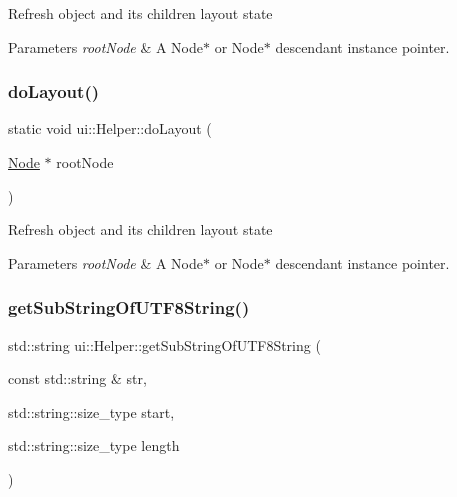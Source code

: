 Refresh object and it\textquotesingle{}s children layout state


\begin{DoxyParams}{Parameters}
{\em root\+Node} & A Node$\ast$ or Node$\ast$ descendant instance pointer. \\
\hline
\end{DoxyParams}
\mbox{\label{classui_1_1Helper_ab57b1f6c65bc4798f6ffb09f0eaae335}} 
\subsubsection{\texorpdfstring{do\+Layout()}{doLayout()}\hspace{0.1cm}{\footnotesize\ttfamily [2/2]}}
{\footnotesize\ttfamily static void ui\+::\+Helper\+::do\+Layout (\begin{DoxyParamCaption}\item[{\hyperlink{classNode}{Node} $\ast$}]{root\+Node }\end{DoxyParamCaption})\hspace{0.3cm}{\ttfamily [static]}}

Refresh object and it\textquotesingle{}s children layout state


\begin{DoxyParams}{Parameters}
{\em root\+Node} & A Node$\ast$ or Node$\ast$ descendant instance pointer. \\
\hline
\end{DoxyParams}
\mbox{\label{classui_1_1Helper_a0c6b4d01d84cb48a0208a3dd3dbe75b9}} 
\subsubsection{\texorpdfstring{get\+Sub\+String\+Of\+U\+T\+F8\+String()}{getSubStringOfUTF8String()}\hspace{0.1cm}{\footnotesize\ttfamily [1/2]}}
{\footnotesize\ttfamily std\+::string ui\+::\+Helper\+::get\+Sub\+String\+Of\+U\+T\+F8\+String (\begin{DoxyParamCaption}\item[{const std\+::string \&}]{str,  }\item[{std\+::string\+::size\+\_\+type}]{start,  }\item[{std\+::string\+::size\+\_\+type}]{length }\end{DoxyParamCaption})\hspace{0.3cm}{\ttfamily [static]}}



